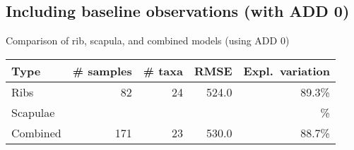 \documentclass{beamer}
\begin{document}




\subsection{Including baseline observations (with ADD 0)}

\begin{frame}{Comparison of rib, scapula, and combined models (using ADD 0)}

  \begin{tabular}{lrrrr}
    Type & \# samples & \# taxa & RMSE & Expl.\ variation\\ \hline
    Ribs & 82 & 24 & 524.0 & 89.3\% \\
    Scapulae &  &  &  & \% \\
    Combined & 171 & 23 & 530.0 & 88.7\%
  \end{tabular}
  
  \vspace{0.2in}



\end{frame}
\end{document}

